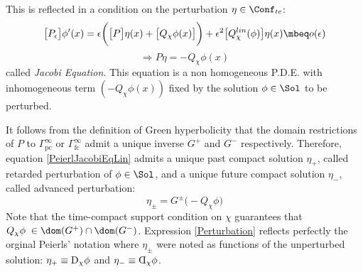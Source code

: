 \documentclass[Main]{subfiles}
\begin{document}
		This is reflected in a condition on the perturbation $\eta \in \Conf_{tc}$:
		\begin{displaymath}
			\big[P_\epsilon\big] \phi'(x) =  \epsilon \biggr( \big[P\big] \eta(x) + \big[Q_\chi \phi(x) \big]\biggr)+ \epsilon^2 \big[Q_\chi^{lin}(\phi)  \big]	\eta(x) \mbeq o(\epsilon)
		\end{displaymath}
		\begin{equation}\label{PeierlJacobiEqLin}
			\Rightarrow P \eta = - Q_\chi \phi(x)
		\end{equation}
		called \emph{Jacobi Equation}.
		This equation is a non homogeneous P.D.E. with inhomogeneous term $ (- Q_\chi \phi(x))$ fixed by the solution $\phi\in \Sol$ to be perturbed.

		It follows from the definition of Green hyperbolicity that the domain restrictions of $P$ to $\Gamma^\infty_{\textrm{pc}}$ or $\Gamma^\infty_{\textrm{fc}}$ admit a unique inverse $G^+$ and $G^-$ respectively.
   		Therefore, equation \ref{PeierlJacobiEqLin} admits a unique past compact solution $\eta_+$, called retarded perturbation of $\phi\in \Sol$, and a unique future compact solution $\eta_-$, called advanced perturbation:
   		\begin{equation}\label{Perturbation}
   			\eta_\pm = G^\pm \big( - Q_\chi \phi \big)
   		\end{equation}
   		Note that the time-compact support condition on $\chi$ guarantees that $Q_\chi \phi \; \in \dom(G^+) \cap \dom(G^-)$.
   		Expression \ref{Perturbation} reflects perfectly the orginal Peierls' notation where $\eta_\pm$ were noted as functions of the unperturbed solution: $\eta_+ \equiv\reflectbox{\reflectbox{D}}_\chi \phi$ and $\eta_- \equiv  \reflectbox{D}_\chi \phi$.
		
\end{document}
